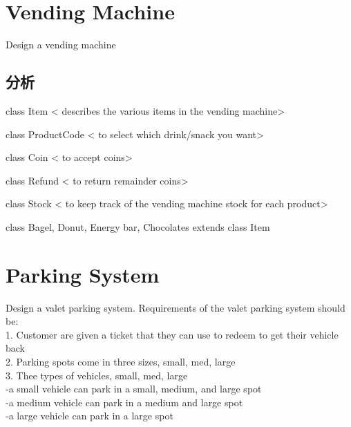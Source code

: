 \section{Vending Machine}
Design a vending machine

\subsection{分析}
class Item < describes the various items in the vending machine> 

class ProductCode < to select which drink/snack you want> 

class Coin < to accept coins> 

class Refund < to return remainder coins> 

class Stock < to keep track of the vending machine stock for each product> 

class Bagel, Donut, Energy bar, Chocolates extends class Item

\section{Parking System}
Design a valet parking system. Requirements of the valet parking system should be: \\
1. Customer are given a ticket that they can use to redeem to get their vehicle back \\
2. Parking spots come in three sizes, small, med, large \\
3. Thee types of vehicles, small, med, large \\
-a small vehicle can park in a small, medium, and large spot \\
-a medium vehicle can park in a medium and large spot \\
-a large vehicle can park in a large spot\\

